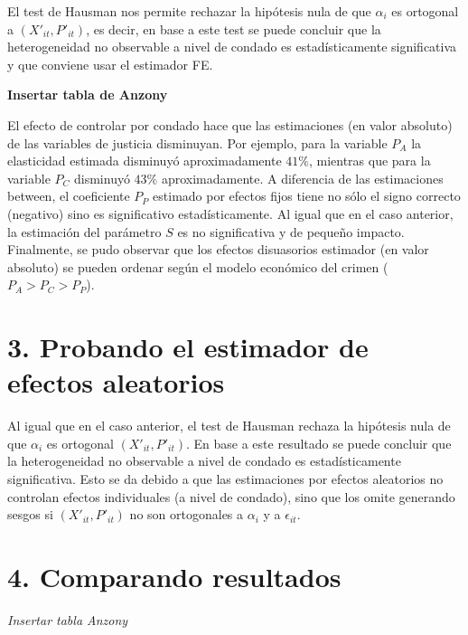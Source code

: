 \documentclass[
]{article}
\begin{document}
El test de Hausman nos permite rechazar la hipótesis nula de que
\(\alpha_i\) es ortogonal a \((X'_{it},P'_{it})\), es decir, en base a
este test se puede concluir que la heterogeneidad no observable a nivel
de condado es estadísticamente significativa y que conviene usar el
estimador FE.

\textbf{Insertar tabla de Anzony}

El efecto de controlar por condado hace que las estimaciones (en valor
absoluto) de las variables de justicia disminuyan. Por ejemplo, para la
variable \(P_A\) la elasticidad estimada disminuyó aproximadamente
\(41\%\), mientras que para la variable \(P_C\) disminuyó \(43\%\)
aproximadamente. A diferencia de las estimaciones between, el
coeficiente \(P_P\) estimado por efectos fijos tiene no sólo el signo
correcto (negativo) sino es significativo estadísticamente. Al igual que
en el caso anterior, la estimación del parámetro \(S\) es no
significativa y de pequeño impacto. Finalmente, se pudo observar que los
efectos disuasorios estimador (en valor absoluto) se pueden ordenar
según el modelo económico del crimen (\(P_A>P_C>P_P\)).

\hypertarget{probando-el-estimador-de-efectos-aleatorios}{%
\section{3. Probando el estimador de efectos
aleatorios}\label{probando-el-estimador-de-efectos-aleatorios}}

Al igual que en el caso anterior, el test de Hausman rechaza la
hipótesis nula de que \(\alpha_i\) es ortogonal \((X'_{it},P'_{it})\).
En base a este resultado se puede concluir que la heterogeneidad no
observable a nivel de condado es estadísticamente significativa. Esto se
da debido a que las estimaciones por efectos aleatorios no controlan
efectos individuales (a nivel de condado), sino que los omite generando
sesgos si \((X'_{it},P'_{it})\) no son ortogonales a \(\alpha_i\) y a
\(\epsilon_{it}\).

\hypertarget{comparando-resultados}{%
\section{4. Comparando resultados}\label{comparando-resultados}}

\emph{Insertar tabla Anzony}
\end{document}
